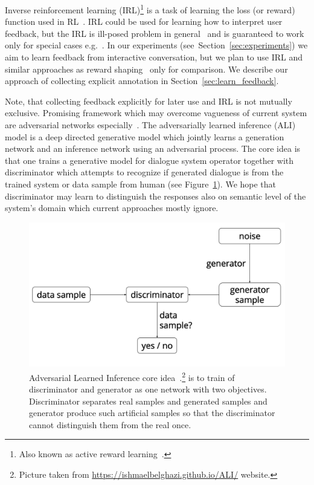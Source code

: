 \documentclass[11pt]{article}
\begin{document}
Inverse reinforcement learning (IRL)\footnote{Also known as active reward learning~\cite{su2016active}.} is a task of learning the loss (or reward) function used in RL~\cite{abbeel_apprenticeship_2004}.
IRL could be used for learning how to interpret user feedback, but the IRL is ill-posed problem in general~\cite{choi_inverse_2011} and is guaranteed to work only for special cases e.g.~\cite{abbeel_apprenticeship_2004,choi_inverse_2011}.  
In our experiments (see~Section~\ref{sec:experiments}) we aim to learn feedback from interactive conversation, but we plan to use IRL and similar approaches as reward shaping~\cite{su2016active} only for comparison.
We describe our approach of collecting explicit annotation in Section~\ref{sec:learn_feedback}.

Note, that collecting feedback explicitly for later use and IRL is not mutually exclusive.
Promising framework which may overcome vagueness of current system are adversarial networks especially~\cite{dumoulin_adversarially_2016}.
The adversarially learned inference (ALI) model is a deep directed generative model which jointly learns a generation network and an inference network using an adversarial process. 
The core idea is that one trains a generative model for dialogue system operator together with discriminator which attempts to recognize if generated dialogue is from the trained system or data sample from human (see Figure~\ref{fig:gan}).
We hope that discriminator may learn to distinguish the responses also on semantic level of the system's domain which current approaches mostly ignore. 

\begin{figure}[htpb]
    \centering
    \includegraphics[width=0.8\linewidth]{gan_simple}
    \caption{Adversarial Learned Inference core idea~\cite{dumoulin_adversarially_2016}.\footnote{Picture taken from \url{https://ishmaelbelghazi.github.io/ALI/} website.} is to train of discriminator and generator as one network with two objectives. Discriminator separates real samples and generated samples and generator produce such artificial samples so that the discriminator cannot distinguish them from the real once.}
    \label{fig:gan}
\end{figure}
\end{document}
